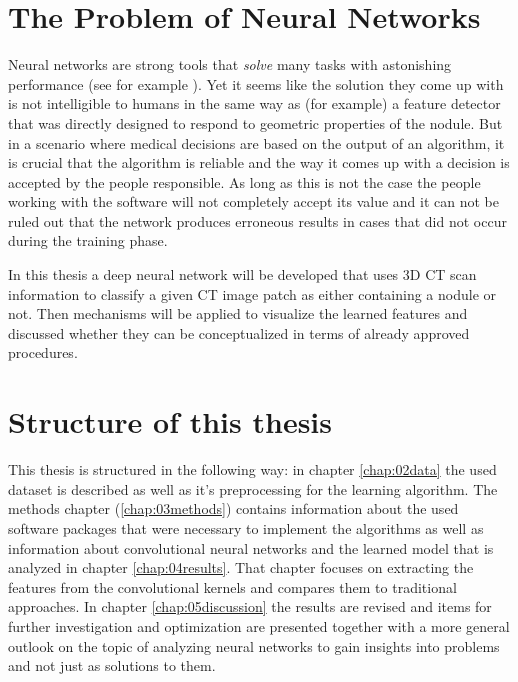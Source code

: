 \documentclass[main.tex]{subfiles}
\begin{document}
\section{The Problem of Neural Networks}
Neural networks are strong tools that \emph{solve} many tasks with astonishing performance (see for example \cite{silver2017alphagozero}). Yet it seems like the solution they come up with is not intelligible to humans in the same way as (for example) a feature detector that was directly designed to respond to geometric properties of the nodule. But in a scenario where medical decisions are based on the output of an algorithm, it is crucial that the algorithm is reliable and the way it comes up with a decision is accepted by the people responsible. As long as this is not the case the people working with the software will not completely accept its value and it can not be ruled out that the network produces erroneous results in cases that did not occur during the training phase.

In this thesis a deep neural network will be developed that uses 3D CT scan information to classify a given CT image patch as either containing a nodule or not. Then mechanisms will be applied to visualize the learned features and discussed whether they can be conceptualized in terms of already approved procedures.


\section{Structure of this thesis}
This thesis is structured in the following way: in chapter \ref{chap:02data} the used dataset is described as well as it's preprocessing for the learning algorithm. The methods chapter (\ref{chap:03methods}) contains information about the used software packages that were necessary to implement the algorithms as well as information about convolutional neural networks and the learned model that is analyzed in chapter \ref{chap:04results}. That chapter focuses on extracting the features from the convolutional kernels and compares them to traditional approaches. In chapter \ref{chap:05discussion} the results are revised and items for further investigation and optimization are presented together with a more general outlook on the topic of analyzing neural networks to gain insights into problems and not just as solutions to them. 
\end{document}
